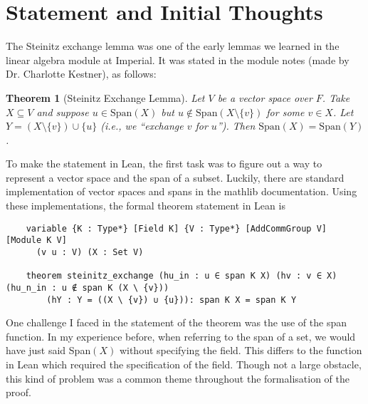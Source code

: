 \documentclass{article}
\newtheorem{Theorem}{Theorem}
\begin{document}
\maketitle

\section{Statement and Initial Thoughts}

The Steinitz exchange lemma was one of the early lemmas we learned in the linear algebra module at Imperial. It was stated in the module notes (made by Dr. Charlotte Kestner), as follows:

\begin{adjustwidth}{1cm}{1cm}
\begin{Theorem}[Steinitz Exchange Lemma]
    Let $V$ be a vector space over $F$. Take $X \subseteq V$ and suppose $u \in \text{Span}(X)$ but $u \not\in \text{Span}(X \setminus \{v\})$ for some $v \in X$. Let $Y = (X \setminus \{v\}) \cup \{u\}$ (i.e., we “exchange $v$ for $u$”). Then $\text{Span}(X) = \text{Span}(Y)$.
\end{Theorem}
\end{adjustwidth}
\vspace{0.5cm}

To make the statement in Lean, the first task was to figure out a way to represent a vector space and the span of a subset. Luckily, there are standard implementation of vector spaces and spans in the mathlib documentation. Using these implementations, the formal theorem statement in Lean is

\begin{lstlisting}
    variable {K : Type*} [Field K] {V : Type*} [AddCommGroup V] [Module K V]
      (v u : V) (X : Set V)
    
    theorem steinitz_exchange (hu_in : u ∈ span K X) (hv : v ∈ X) (hu_n_in : u ∉ span K (X \ {v}))
        (hY : Y = ((X \ {v}) ∪ {u})): span K X = span K Y
\end{lstlisting}

One challenge I faced in the statement of the theorem was the use of the span function. In my experience before, when referring to the span of a set, we would have just said Span\((X)\) without specifying the field. This differs to the function in Lean which required the specification of the field. Though not a large obstacle, this kind of problem was a common theme throughout the formalisation of the proof.\\
\end{document}

